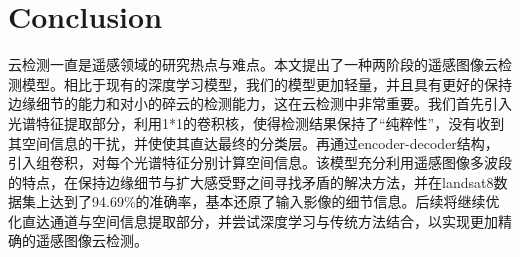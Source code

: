\documentclass[UTF8]{ctexart}
\begin{document}
\section[]{Conclusion}
云检测一直是遥感领域的研究热点与难点。本文提出了一种两阶段的遥感图像云检测模型。相比于现有的深度学习模型，我们的模型更加轻量，并且具有更好的保持边缘细节的能力和对小的碎云的检测能力，这在云检测中非常重要。我们首先引入光谱特征提取部分，利用1*1的卷积核，使得检测结果保持了“纯粹性”，没有收到其空间信息的干扰，并使使其直达最终的分类层。再通过encoder-decoder结构，引入组卷积，对每个光谱特征分别计算空间信息。该模型充分利用遥感图像多波段的特点，在保持边缘细节与扩大感受野之间寻找矛盾的解决方法，并在landsat8数据集上达到了94.69\%的准确率，基本还原了输入影像的细节信息。后续将继续优化直达通道与空间信息提取部分，并尝试深度学习与传统方法结合，以实现更加精确的遥感图像云检测。


\end{document}
